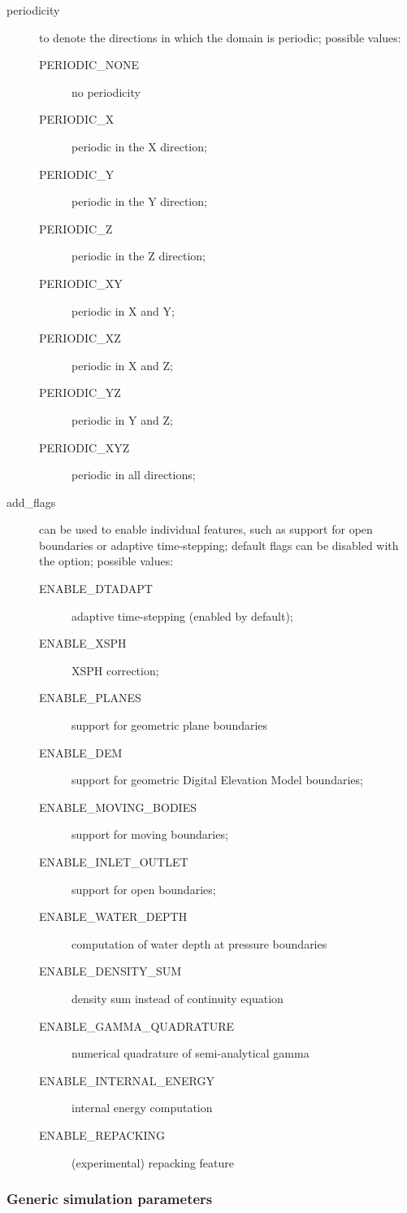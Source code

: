 \documentclass{../GPUSPHtemplate}
\begin{document}
\begin{description}
\item[periodicity] to denote the directions in which the domain is periodic; possible values:
\begin{description}
\item[PERIODIC\_NONE] no periodicity
\item[PERIODIC\_X] periodic in the X direction;
\item[PERIODIC\_Y] periodic in the Y direction;
\item[PERIODIC\_Z] periodic in the Z direction;
\item[PERIODIC\_XY] periodic in X and Y;
\item[PERIODIC\_XZ] periodic in X and Z;
\item[PERIODIC\_YZ] periodic in Y and Z;
\item[PERIODIC\_XYZ] periodic in all directions;
\end{description}

\item[add_flags] can be used to enable individual features, such as support for open boundaries or adaptive
time-stepping; default flags can be disabled with the  option; possible values:
\begin{description}
\item[ENABLE\_DTADAPT] adaptive time-stepping (enabled by default);
\item[ENABLE\_XSPH] XSPH correction;
\item[ENABLE\_PLANES] support for geometric plane boundaries
\item[ENABLE\_DEM] support for geometric Digital Elevation Model boundaries;
\item[ENABLE\_MOVING\_BODIES] support for moving boundaries;
\item[ENABLE\_INLET\_OUTLET] support for open boundaries;
\item[ENABLE\_WATER\_DEPTH] computation of water depth at pressure boundaries
\item[ENABLE\_DENSITY\_SUM] density sum instead of continuity equation
\item[ENABLE\_GAMMA\_QUADRATURE] numerical quadrature of semi-analytical gamma
\item[ENABLE\_INTERNAL\_ENERGY] internal energy computation
\item[ENABLE\_REPACKING] (experimental) repacking feature
\end{description}
\end{description}


\subsubsection{Generic simulation parameters}
\end{document}
